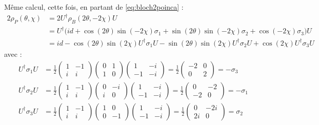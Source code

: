 Même calcul, cette fois, en partant de \eqref{eq:bloch2poinca} :
\begin{align*}
	2\rho_P(\theta, \chi) &= 2U^\dagger \rho_B(2\theta, -2\chi) U \\
	&= U^\dagger \Big( id + \cos(2\theta) \sin(-2\chi) \sigma_1 + \sin(2\theta) \sin(-2\chi) \sigma_2 + \cos (-2\chi) \sigma_3 \Big) U \\
	&= id - \cos(2\theta) \sin(2\chi) U^\dagger \sigma_1 U - \sin(2\theta) \sin(2\chi) U^\dagger \sigma_2 U + \cos (2\chi) U^\dagger \sigma_3 U
\end{align*}
avec :
\begin{align*}
	U^\dagger \sigma_1 U &= \frac{1}{2} \begin{pmatrix} 
		1 & -1 \\ i & i
	\end{pmatrix} \begin{pmatrix} 
		0 & 1 \\ 1 &  0 
	\end{pmatrix} \begin{pmatrix} 
		1 & -i \\ -1 & -i
	\end{pmatrix} = \frac{1}{2} \begin{pmatrix} 
		-2 & 0 \\ 0 & 2
	\end{pmatrix} = -\sigma_3 \\
	U^\dagger \sigma_2 U &= \frac{1}{2} \begin{pmatrix} 
		1 & -1 \\ i & i
	\end{pmatrix} \begin{pmatrix} 
		0 & -i \\  i &  0 
	\end{pmatrix} \begin{pmatrix} 
		1 & -i \\ -1 & -i
	\end{pmatrix} = \frac{1}{2} \begin{pmatrix} 
		0 & -2 \\ -2 & 0
	\end{pmatrix} = -\sigma_1 \\
	U^\dagger \sigma_3 U &= \frac{1}{2} \begin{pmatrix} 
		1 & -1 \\ i & i
	\end{pmatrix}  \begin{pmatrix} 
		1 & 0 \\ 0 & -1 
	\end{pmatrix} \begin{pmatrix} 
		1 & -i \\ -1 & -i
	\end{pmatrix} = \frac{1}{2} \begin{pmatrix} 
		0 & -2i \\ 2i & 0
	\end{pmatrix} = \sigma_2
\end{align*}

